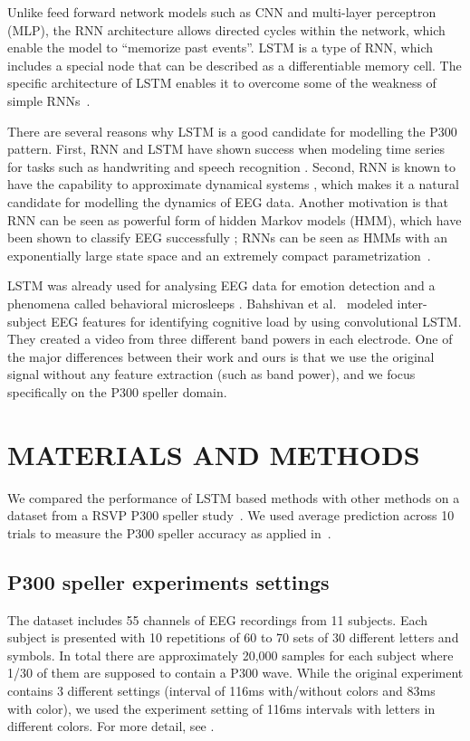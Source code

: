 \documentclass[
12pt, %
english, %
doublespacing, %
headsepline, %
]{MastersDoctoralThesis} %
\begin{document}
Unlike feed forward network models such as CNN and multi-layer perceptron (MLP),  the RNN architecture allows directed cycles within the network, which enable the model to ``memorize past events''. LSTM \cite{LSTM_origin} is a type of RNN, which includes a special node that can be described as a differentiable memory cell. The specific architecture of LSTM enables it to overcome some of the weakness of simple RNNs~\cite{bengio1994learning}.

There are several reasons why LSTM is a good candidate for modelling the P300 pattern. First, RNN and LSTM have shown success when modeling time series for tasks such as handwriting and speech recognition \cite{graves2013speech,  graves2008unconstrained, yue2015beyond}. Second, RNN is known to have the capability to approximate dynamical systems \cite{li2005approximation}, which makes it a natural candidate for modelling the dynamics of EEG data. Another motivation is that RNN can be seen as powerful form of hidden Markov models (HMM), which have been shown to classify EEG successfully \cite{solhjoo2005classification,obermaier2001hidden,cincotti2003comparison}; RNNs can be seen as HMMs with an exponentially large state space and an extremely compact parametrization~\cite{sutskever2009recurrent}.

LSTM was already used for analysing EEG data for emotion detection \cite{soleymani2014continuous} and a phenomena called behavioral microsleeps \cite{davidson2005detecting}. Bahshivan et al.~\cite{LSTM_EEG} modeled inter-subject EEG features for identifying cognitive load by using convolutional LSTM. They created a video from three different band powers in each electrode. One of the major differences between their work and ours is that we use the original signal without any feature extraction (such as band power), and we focus specifically on the P300 speller domain.

\chapter{MATERIALS AND METHODS}

We compared the performance of LSTM based methods with other methods on a dataset from a RSVP P300 speller study~\cite{BlaknertzExperiment}. We used  average prediction across 10 trials to measure the P300 speller accuracy as applied in~\cite{BlaknertzExperiment}.

\section{P300 speller experiments settings}
The dataset includes 55 channels of EEG recordings from 11 subjects. Each subject is presented with 10 repetitions of 60 to 70 sets of 30 different letters and symbols. In total there are approximately 20,000 samples for each subject where 1/30 of them are supposed to contain a P300 wave. While the original experiment contains 3 different settings (interval of 116ms with/without colors and 83ms with color), we used the experiment setting of 116ms intervals with letters in different colors. For more detail, see \cite{BlaknertzExperiment}. 
\end{document}
